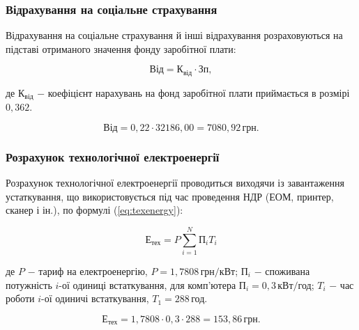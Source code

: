\subsubsection{Відрахування на соціальне страхування}

Відрахування на соціальне страхування й інші відрахування розраховуються на підставі отриманого значення фонду заробітної плати:

\begin{equation}\label{eq:soc}
\text{Від} = \text{К}_{\text{від}} \cdot \text{Зп},
\end{equation}


\noindent де $\text{К}_{\text{від}}$ $-$ коефіцієнт нарахувань на фонд заробітної плати приймається в\newline 
\hspace*{15pt} розмірі $0,362$.

\[
\text{Від} = 0,22 \cdot 32186,00 = 7080,92 \, \text{грн}.
\]

\vspace{1.5em}

\subsubsection{Розрахунок технологічної електроенергії}

Розрахунок технологічної електроенергії проводиться виходячи із завантаження устаткування, що використовується під час проведення НДР (ЕОМ, принтер, сканер і ін.), по формулі (\ref{eq:texenergy}):

\begin{equation}\label{eq:texenergy}
\text{Е}_{\text{тех}} = P \sum_{i=1}^{N}\text{П}_{i}T_{i}
\end{equation}

\noindent де $P$ $-$ тариф на електроенергію, $P = 1,7808 \, \text{грн}/\text{кВт}$; \newline
\hspace*{15pt} $\text{П}_{i}$ $-$ споживана потужність $i$-ої одиниці встаткування, для комп'ютера\newline
\hspace*{15pt} $\text{П}_{i} = 0,3 \, \text{кВт}/\text{год}$;\newline
\hspace*{15pt} $T_{i}$ $-$ час роботи $i$-ої одиничі встаткування, $T_{1} = 288 \, \text{год}$.

\[
\text{Е}_{\text{тех}} = 1,7808 \cdot 0,3 \cdot 288 = 153,86 \, \text{грн}.
\]

